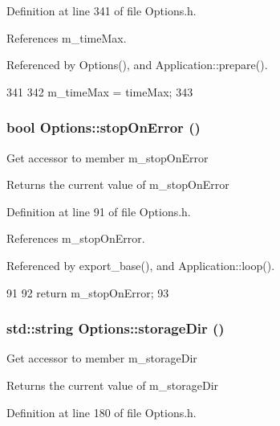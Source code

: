 Definition at line 341 of file Options.h.

References m\_\-timeMax.

Referenced by Options(), and Application::prepare().


\begin{DoxyCode}
341                                                 {
342                 m_timeMax = timeMax;
343         }
\end{DoxyCode}
\hypertarget{classOptions_afcd7b27fdf474050d912571e09525efe}{
\subsubsection[{stopOnError}]{\setlength{\rightskip}{0pt plus 5cm}bool Options::stopOnError ()}}
\label{classOptions_afcd7b27fdf474050d912571e09525efe}
Get accessor to member m\_\-stopOnError \begin{DoxyReturn}{Returns}
the current value of m\_\-stopOnError 
\end{DoxyReturn}


Definition at line 91 of file Options.h.

References m\_\-stopOnError.

Referenced by export\_\-base(), and Application::loop().


\begin{DoxyCode}
91                             {
92                 return m_stopOnError;
93         }
\end{DoxyCode}
\hypertarget{classOptions_a5e8026ed2674f8f5db444b52fea27fda}{
\subsubsection[{storageDir}]{\setlength{\rightskip}{0pt plus 5cm}std::string Options::storageDir ()}}
\label{classOptions_a5e8026ed2674f8f5db444b52fea27fda}
Get accessor to member m\_\-storageDir \begin{DoxyReturn}{Returns}
the current value of m\_\-storageDir 
\end{DoxyReturn}


Definition at line 180 of file Options.h.

